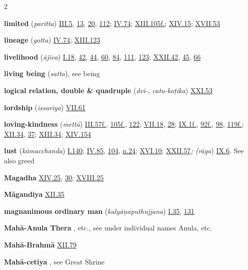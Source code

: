 \begin{multicols}{2}
\begin{vismHanging}
\par\textbf{limited} (\emph{paritta}) \hyperlink{III.5}{III.5}{}, \hyperlink{III.13}{13}{}, \hyperlink{III.20}{20}{}, \hyperlink{III.112}{112}{}; \hyperlink{IV.74}{IV.74}{}; \hyperlink{XIII.105}{XIII.105f.}{}; \hyperlink{XIV.15}{XIV.15}{}; \hyperlink{XVII.53}{XVII.53}{}
\par\textbf{lineage} (\emph{gotta}) \hyperlink{IV.74}{IV.74}{}; \hyperlink{XIII.123}{XIII.123}{}
\par\textbf{livelihood} (\emph{ājīva}) \hyperlink{I.18}{I.18}{}, \hyperlink{I.42}{42}{}, \hyperlink{I.44}{44}{}, \hyperlink{I.60}{60}{}, \hyperlink{I.84}{84}{}, \hyperlink{I.111}{111}{}, \hyperlink{I.123}{123}{}; \hyperlink{XXII.42}{XXII.42}{}, \hyperlink{XXII.45}{45}{}, \hyperlink{XXII.66}{66}{}
\par\textbf{living being} (\emph{satta}), see being
\par\textbf{logical relation, double \& quadruple} (\emph{dvi-, catu-koṭika}) \hyperlink{XXI.53}{XXI.53}{}
\par\textbf{lordship} (\emph{issariya}) \hyperlink{VII.61}{VII.61}{}
\par\textbf{loving-kindness} (\emph{mettā}) \hyperlink{III.57}{III.57f.}{}, \hyperlink{III.105}{105f.}{}, \hyperlink{III.122}{122}{}; \hyperlink{VII.18}{VII.18}{}, \hyperlink{VII.28}{28}{}; \hyperlink{IX.1}{IX.1f.}{}, \hyperlink{IX.92}{92f.}{}, \hyperlink{IX.98}{98}{}, \hyperlink{IX.119}{119f.}{}; \hyperlink{XII.34}{XII.34}{}, \hyperlink{XII.37}{37}{}; \hyperlink{XIII.34}{XIII.34}{}; \hyperlink{XIV.154}{XIV.154}{}
\par\textbf{lust} (\emph{kāmacchanda}) \hyperlink{I.140}{I.140}{}; \hyperlink{IV.85}{IV.85}{}, \hyperlink{IV.104}{104}{}, \hyperlink{IV.n24}{n.24}{}; \hyperlink{XVI.10}{XVI.10}{}; \hyperlink{XXII.57}{XXII.57}{}\emph{; (}\emph{rāga}) \hyperlink{IX.6}{IX.6}{}. See also greed 
\par\textbf{Magadha} \hyperlink{XIV.25}{XIV.25}{}, \hyperlink{XIV.30}{30}{}; \hyperlink{XVIII.25}{XVIII.25}{}
\par\textbf{Māgandiya} \hyperlink{XII.35}{XII.35}{}
\par\textbf{magnanimous ordinary man} (\emph{kalyāṇaputhujjana}) \hyperlink{I.35}{I.35}{}, \hyperlink{I.131}{131}{}
\par\textbf{Mahā-Anula Thera} , etc., see under individual names Anula, etc. 
\par\textbf{Mahā-Brahmā} \hyperlink{XII.79}{XII.79}{}
\par\textbf{Mahā-cetiya} , see Great Shrine

\end{vismHanging}
\end{multicols}
